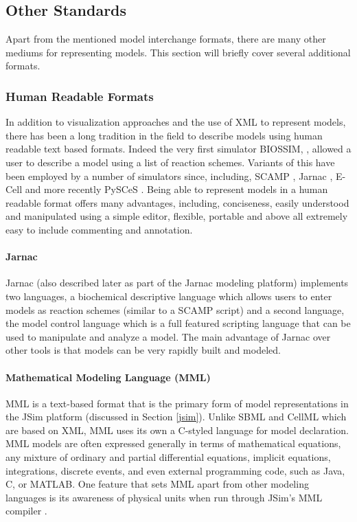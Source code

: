 \subsection{Other Standards}

Apart from the mentioned model interchange formats, there are many other
mediums for representing models. This section will briefly cover several
additional formats.

\subsubsection{Human Readable Formats}

In addition to visualization approaches and the use of XML to represent
models, there has been a long tradition in the field to describe models
using human readable text based formats. Indeed the very first simulator
BIOSSIM, \autocite{Ga68}, allowed a user to describe a model using a
list of reaction schemes. Variants of this have been employed by a
number of simulators since, including, SCAMP \autocite{SauroF91}, Jarnac
\autocite{sauro:2000}, E-Cell \autocite{ECELL} and more recently PySCeS
\autocite{Pysces2004}. Being able to represent models in a human
readable format offers many advantages, including, conciseness, easily
understood and manipulated using a simple editor, flexible, portable and
above all extremely easy to include commenting and annotation.

\paragraph{Jarnac}

Jarnac \autocite{sauro:2000} \autocite{bergmann2006sbw} (also described
later as part of the Jarnac modeling platform) implements two languages,
a biochemical descriptive language which allows users to enter models as
reaction schemes (similar to a SCAMP script) and a second language, the
model control language which is a full featured scripting language that
can be used to manipulate and analyze a model. The main advantage of
Jarnac over other tools is that models can be very rapidly built and
modeled.

\paragraph{Mathematical Modeling Language (MML)}

MML is a text-based format that is the primary form of model
representations in the JSim platform \autocite{raymond03} (discussed in
Section \ref{jsim}). Unlike SBML and CellML which are based on XML, MML
uses its own a C-styled language for model declaration. MML models are
often expressed generally in terms of mathematical equations, any
mixture of ordinary and partial differential equations, implicit
equations, integrations, discrete events, and even external programming
code, such as Java, C, or MATLAB. One feature that sets MML apart from
other modeling languages is its awareness of physical units when run
through JSim's MML compiler \autocite{chizeck2009}.

